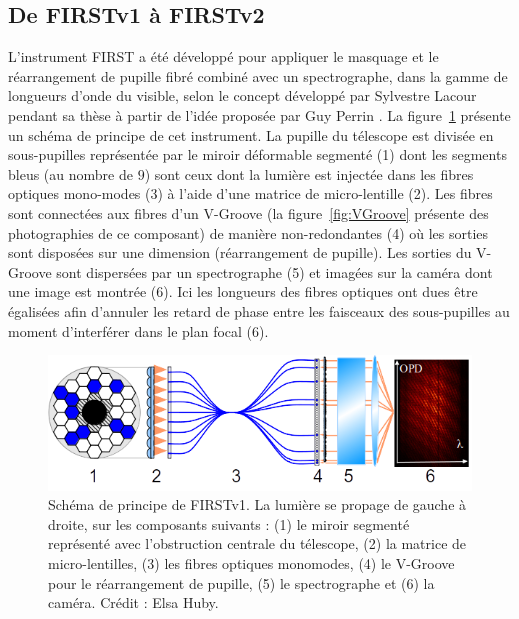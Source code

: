 \subsection{De FIRSTv1 à FIRSTv2}

L'instrument \ac{FIRST} a été développé \citep{kotani2008} pour appliquer le masquage et le réarrangement de pupille fibré combiné avec un spectrographe, dans la gamme de longueurs d'onde du visible, selon le concept développé par Sylvestre Lacour pendant sa thèse \citep{lacour2010} à partir de l'idée proposée par Guy Perrin \citep{perrin2006}. La figure~\ref{fig:FIRSTv1Scheme} présente un schéma de principe de cet instrument. La pupille du télescope est divisée en sous-pupilles représentée par le miroir déformable segmenté (1) dont les segments bleus (au nombre de $9$) sont ceux dont la lumière est injectée dans les fibres optiques mono-modes (3) à l'aide d'une matrice de micro-lentille (2). Les fibres sont connectées aux fibres d'un V-Groove (la figure~\ref{fig:VGroove} présente des photographies de ce composant) de manière non-redondantes (4) où les sorties sont disposées sur une dimension (réarrangement de pupille). Les sorties du V-Groove sont dispersées par un spectrographe (5) et imagées sur la caméra dont une image est montrée (6). Ici les longueurs des fibres optiques ont dues être égalisées afin d'annuler les retard de phase entre les faisceaux des sous-pupilles au moment d'interférer dans le plan focal (6).

\begin{figure}[ht!]
    \centering
    \includegraphics[width=\figwidth]{Figure_Chap1/FIRSTv1Scheme_36Outputs_Fringes_b.png}
    \caption[Schéma de principe de FIRSTv1.]{Schéma de principe de FIRSTv1. La lumière se propage de gauche à droite, sur les composants suivants : (1) le miroir segmenté représenté avec l'obstruction centrale du télescope, (2) la matrice de micro-lentilles, (3) les fibres optiques monomodes, (4) le V-Groove pour le réarrangement de pupille, (5) le spectrographe et (6) la caméra. Crédit : Elsa Huby.}
    \label{fig:FIRSTv1Scheme}
\end{figure}


